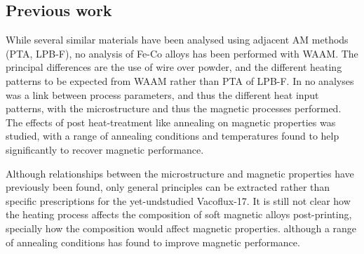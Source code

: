 





\subsection{Previous work}

While several similar materials have been analysed using adjacent AM methods (PTA, LPB-F), no analysis of Fe-Co alloys has been performed with WAAM. The principal differences are the use of wire over powder, and the different heating patterns to be expected from WAAM rather than PTA of LPB-F. In no analyses was a link between process parameters, and thus the different heat input patterns, with the microstructure and thus the magnetic processes performed. The effects of post heat-treatment like annealing on magnetic properties was studied, with a range of annealing conditions and temperatures found to help significantly to recover magnetic performance.

Although relationships between the microstructure and magnetic properties have previously been found, only general principles can be extracted rather than specific prescriptions for the yet-undstudied Vacoflux-17.
It is still not clear how the heating process affects the composition of soft magnetic alloys post-printing, specially how the composition would affect magnetic properties. although a range of annealing conditions has found to improve magnetic performance.

